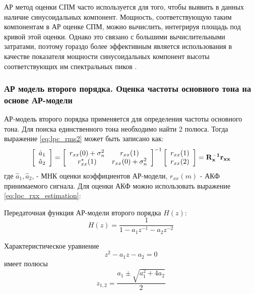 АР метод оценки СПМ часто используется для того, чтобы выявить в данных наличие синусоидальных
компонент. Мощность, соответствующую  таким компонентам в АР оценке СПМ, можно вычислить, интегрируя
площадь под кривой этой оценки. Однако это связано с большими вычислительными затратами, поэтому
гораздо более эффективным является использования в качестве показателя мощности синусоидальных
компонент высоты соответствующих им спектральных пиков \cite{marpl_book}.  

\subsubsection{АР модель второго порядка. Оценка частоты основного тона на основе АР-модели}

АР-модель второго порядка применяется для определения частоты основного тона. Для поиска единственного
тона необходимо найти 2 полюса. Тогда выражение \ref{eq:lpc_rms2} может быть записано как:
\begin{equation}
	\label{eq:lpc_a_estimation}
	\left[ \begin{array}{c}
		\hat{a}_1 \\
		\hat{a}_2
	\end{array} \right]
	=
		\left[ \begin{array}{cc}
			r_{xx}(0)  + \sigma_n^2 & r_{xx}(1)\\
			r_{xx}^*(1) & r_{xx}(0) + \sigma_n^2 
		\end{array} \right]^{-1}
		\left[ \begin{array}{c}
			r_{xx}(1) \\
			r_{xx}(2)
		\end{array} \right]
	= \bf{R_x^{-1}r_{xx}}
\end{equation}
где ${\hat{a}_1, \hat{a}_2}$, - МНК оценки коэффициентов АР-модели, ${r_{xx}(m)}$ - АКФ принимаемого сигнала.
Для оценки АКФ  можно использовать выражение \ref{eq:lpc_rxx_estimation}:

Передаточная функция АР-модели второго порядка ${H(z)}$:
\begin{equation}
	\label{eq:lpc_spectral_func}
	H(z) = \frac{1}{1 - a_1 z^{-1} - a_2 z^{-2}}
\end{equation}

Характеристическое уравнение
\begin{equation}
	\label{eq:lpc_characteristic}
	z^2 - a_1 z - a_2 = 0
\end{equation}
имеет полюсы
\begin{equation}
	\label{eq:lpc_poles_2}
	z_{1,2} =\frac{a_1 \pm \sqrt{a_1^2 + 4 a_2}}{2}
\end{equation}

